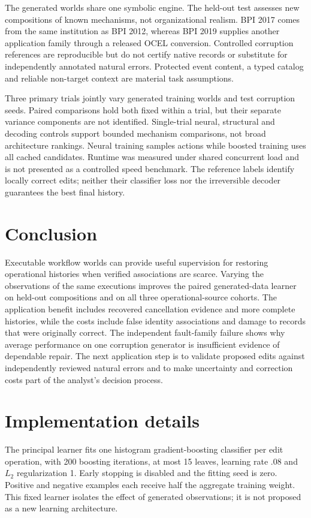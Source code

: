 \documentclass[11pt]{article}
\begin{document}
The generated worlds share one symbolic engine. The held-out test assesses new compositions of known mechanisms, not organizational realism. BPI 2017 comes from the same institution as BPI 2012, whereas BPI 2019 supplies another application family through a released OCEL conversion. Controlled corruption references are reproducible but do not certify native records or substitute for independently annotated natural errors. Protected event content, a typed catalog and reliable non-target context are material task assumptions.

Three primary trials jointly vary generated training worlds and test corruption seeds. Paired comparisons hold both fixed within a trial, but their separate variance components are not identified. Single-trial neural, structural and decoding controls support bounded mechanism comparisons, not broad architecture rankings. Neural training samples actions while boosted training uses all cached candidates. Runtime was measured under shared concurrent load and is not presented as a controlled speed benchmark. The reference labels identify locally correct edits; neither their classifier loss nor the irreversible decoder guarantees the best final history.

\section{Conclusion}
Executable workflow worlds can provide useful supervision for restoring operational histories when verified associations are scarce. Varying the observations of the same executions improves the paired generated-data learner on held-out compositions and on all three operational-source cohorts. The application benefit includes recovered cancellation evidence and more complete histories, while the costs include false identity associations and damage to records that were originally correct. The independent fault-family failure shows why average performance on one corruption generator is insufficient evidence of dependable repair. The next application step is to validate proposed edits against independently reviewed natural errors and to make uncertainty and correction costs part of the analyst's decision process.

\appendix
\section{Implementation details}
The principal learner fits one histogram gradient-boosting classifier per edit operation, with 200 boosting iterations, at most 15 leaves, learning rate .08 and $L_2$ regularization 1. Early stopping is disabled and the fitting seed is zero. Positive and negative examples each receive half the aggregate training weight. This fixed learner isolates the effect of generated observations; it is not proposed as a new learning architecture.
\end{document}
